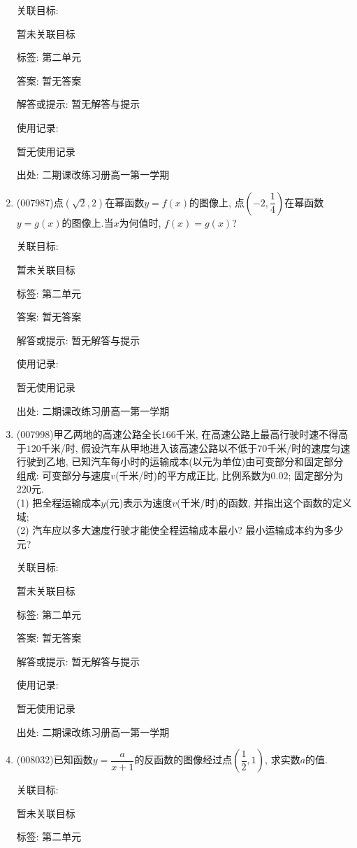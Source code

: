 \documentclass[10pt,a4paper]{article}
\begin{document}
\begin{enumerate}[1.]
关联目标:

暂未关联目标



标签: 第二单元

答案: 暂无答案

解答或提示: 暂无解答与提示

使用记录:

暂无使用记录


出处: 二期课改练习册高一第一学期
\item { (007987)}点$(\sqrt 2,2)$在幂函数$y=f(x)$的图像上, 点$(-2,\dfrac 14)$在幂函数$y=g(x)$的图像上.当$x$为何值时, $f(x)=g(x)$?


关联目标:

暂未关联目标



标签: 第二单元

答案: 暂无答案

解答或提示: 暂无解答与提示

使用记录:

暂无使用记录


出处: 二期课改练习册高一第一学期
\item { (007998)}甲乙两地的高速公路全长$166$千米, 在高速公路上最高行驶时速不得高于$120$千米/时, 假设汽车从甲地进入该高速公路以不低于$70$千米/时的速度匀速行驶到乙地, 已知汽车每小时的运输成本(以元为单位)由可变部分和固定部分组成: 可变部分与速度$v$(千米/时)的平方成正比, 比例系数为$0.02$; 固定部分为$220$元.\\
(1) 把全程运输成本$y$(元)表示为速度$v$(千米/时)的函数, 并指出这个函数的定义域;\\
(2) 汽车应以多大速度行驶才能使全程运输成本最小? 最小运输成本约为多少元?


关联目标:

暂未关联目标



标签: 第二单元

答案: 暂无答案

解答或提示: 暂无解答与提示

使用记录:

暂无使用记录


出处: 二期课改练习册高一第一学期
\item { (008032)}已知函数$y=\dfrac a{x+1}$的反函数的图像经过点$(\dfrac 12,1)$, 求实数$a$的值.


关联目标:

暂未关联目标



标签: 第二单元


\end{enumerate}
\end{document}

